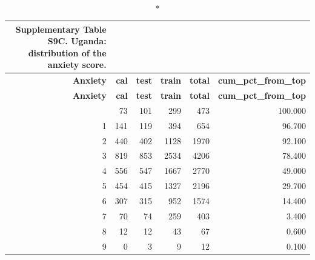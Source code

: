 \documentclass[10pt]{article}
\begin{document}
\tiny
\setlength{\tabcolsep}{2pt}
\begin{longtable}{rrrrrr}
\caption*{\textbf{Supplementary Table S9C.} Uganda: distribution of the anxiety score.}\\
\toprule
\textbf{Anxiety} & \textbf{cal} & \textbf{test} & \textbf{train} & \textbf{total} & \textbf{cum\_pct\_from\_top} \\
\midrule
\endfirsthead
\toprule
\textbf{Anxiety} & \textbf{cal} & \textbf{test} & \textbf{train} & \textbf{total} & \textbf{cum\_pct\_from\_top} \\
\midrule
\endhead
\bottomrule
\endfoot
0 & 73 & 101 & 299 & 473 & 100.000 \\
1 & 141 & 119 & 394 & 654 & 96.700 \\
2 & 440 & 402 & 1128 & 1970 & 92.100 \\
3 & 819 & 853 & 2534 & 4206 & 78.400 \\
4 & 556 & 547 & 1667 & 2770 & 49.000 \\
5 & 454 & 415 & 1327 & 2196 & 29.700 \\
6 & 307 & 315 & 952 & 1574 & 14.400 \\
7 & 70 & 74 & 259 & 403 & 3.400 \\
8 & 12 & 12 & 43 & 67 & 0.600 \\
9 & 0 & 3 & 9 & 12 & 0.100 \\
\bottomrule
\end{longtable}
\normalsize
\end{document}
